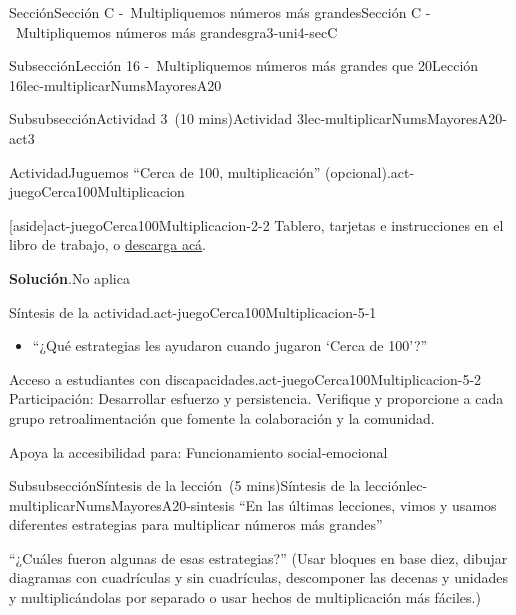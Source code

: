\documentclass[oneside,10pt,]{article}
\newcommand{\blocktitlefont}{\relax}
\begin{document}
\begin{sectionptx}{Sección}{Sección C -~Multipliquemos números más grandes}{}{Sección C -~Multipliquemos números más grandes}{}{}{gra3-uni4-secC}
\begin{subsectionptx}{Subsección}{Lección 16 -~Multipliquemos números más grandes que 20}{}{Lección 16}{}{}{lec-multiplicarNumsMayoresA20}
\begin{subsubsectionptx}{Subsubsección}{Actividad 3~(10 mins)}{}{Actividad 3}{}{}{lec-multiplicarNumsMayoresA20-act3}
\begin{activity}{Actividad}{Juguemos “Cerca de 100, multiplicación” (opcional).}{act-juegoCerca100Multiplicacion}
\begin{sidebyside}{2}{0.05}{0.05}{0.1}
\begin{sbspanel}{0.3}
\end{sbspanel}%
\end{sidebyside}%
\begin{aside}{[aside]}{}{act-juegoCerca100Multiplicacion-2-2}%
Tablero, tarjetas e instrucciones en el libro de trabajo, o \href{external/act-pdf/act-juegoCerca100Multiplicacion.pdf}{descarga acá}\footnotemark{}.%
\end{aside}
\par\smallskip%
\noindent\textbf{\blocktitlefont Solución}.\hypertarget{act-juegoCerca100Multiplicacion-3}{}\quad{}No aplica%
\end{activity}%
%
%
\par
\begin{paragraphs}{Síntesis de la actividad.}{act-juegoCerca100Multiplicacion-5-1}%
%
\begin{itemize}[label=\textbullet]
\item{}``¿Qué estrategias les ayudaron cuando jugaron ‘Cerca de 100’?''%
\end{itemize}
\end{paragraphs}%
\begin{paragraphs}{Acceso a estudiantes con discapacidades.}{act-juegoCerca100Multiplicacion-5-2}%
Participación: Desarrollar esfuerzo y persistencia. Verifique y proporcione a cada grupo retroalimentación que fomente la colaboración y la comunidad.%
\par
Apoya la accesibilidad para: Funcionamiento social-emocional%
\end{paragraphs}%
\end{subsubsectionptx}
%
%
\typeout{************************************************}
\typeout{************************************************}
%
\begin{subsubsectionptx}{Subsubsección}{Síntesis de la lección~(5 mins)}{}{Síntesis de la lección}{}{}{lec-multiplicarNumsMayoresA20-sintesis}
``En las últimas lecciones, vimos y usamos diferentes estrategias para multiplicar números más grandes''%
\par
``¿Cuáles fueron algunas de esas estrategias?'' (Usar bloques en base diez, dibujar diagramas con cuadrículas y sin cuadrículas, descomponer las decenas y unidades y multiplicándolas por separado o usar hechos de multiplicación más fáciles.)%

\end{subsubsectionptx}
\end{subsectionptx}
\end{sectionptx}
\end{document}
